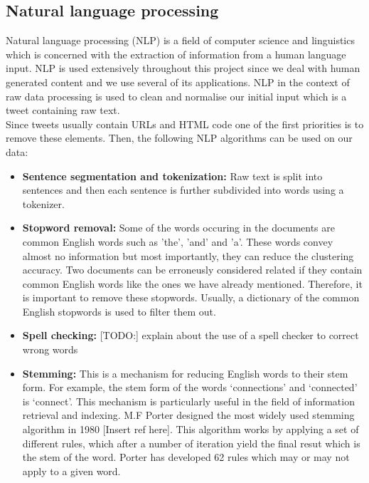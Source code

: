 \subsection{Natural language processing}

Natural language processing (NLP) is a field of computer science and linguistics which is concerned with the extraction of information from a human language 
input. NLP is used extensively throughout this project since we deal with human generated content and we use several of its applications. NLP in the context 
of raw data processing is used to clean and normalise our initial input which is a tweet containing raw text.\\ 
Since tweets usually contain URLs and HTML code one of the first priorities is to remove these elements. Then, the following NLP algorithms
can be used on our data:

\begin{itemize}
 \item \textbf{Sentence segmentation and tokenization:} Raw text is split into sentences and then each sentence is further subdivided into words using a tokenizer. 
 \item \textbf{Stopword removal:} Some of the words occuring in the documents are common English words such as 'the', 'and' and 'a'. These words convey almost no information 
 but most importantly, they can reduce the clustering accuracy. Two documents can be erroneusly considered related if they contain common English words like the ones
  we have already mentioned. Therefore, it is important to remove these stopwords. Usually, a dictionary of the common English stopwords is used to filter them out.   
 \item \textbf{Spell checking:} [TODO:] explain about the use of a spell checker to correct wrong words
 \item \textbf{Stemming:} This is a mechanism for reducing English words to their stem form. For example, the stem form of the words `connections' and `connected' is `connect'. This mechanism is particularly useful in the field of information retrieval and indexing. M.F Porter designed the most widely used stemming algorithm in 1980 [Insert ref here]. This algorithm works by applying a set of different rules, which after a number of iteration yield the final resut which is the stem of the word. Porter
has developed 62 rules which may or may not apply to a given word.
\end{itemize}\vspace{15pt}

